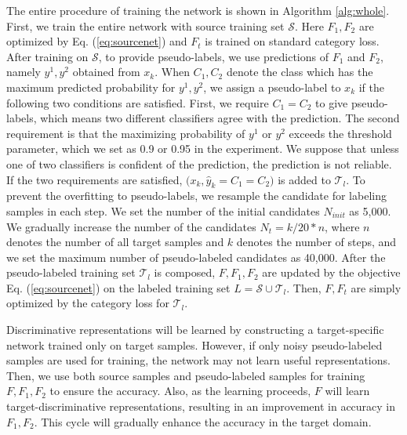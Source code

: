 \documentclass{article}
\begin{document}
The entire procedure of training the network is shown in Algorithm \ref{alg:whole}. First, we train the entire network with source training set $\mathcal{S}$. Here $F_1,F_2$ are optimized by Eq. (\ref{eq:sourcenet}) and $F_t$ is trained on standard category loss.
After training on $\mathcal{S}$, to provide pseudo-labels, we use predictions of $F_1$ and $F_2$, namely $y^{1},y^{2}$ obtained from $x_k$.
When $C_1,C_2$ denote the class which has the maximum predicted probability for $y^{1},y^{2}$, we assign a pseudo-label to $x_k$ if the following two conditions are satisfied. First, we require $C_1=C_2$ to give pseudo-labels, which means two different classifiers agree with the prediction. The second requirement is that the maximizing probability of $y^{1}$ or $y^{2}$ exceeds the threshold parameter, which we set as 0.9 or 0.95 in the experiment. We suppose that unless one of two classifiers is confident of the prediction, the prediction is not reliable. If the two requirements are satisfied, $\bigl({{x_k},{\hat{y}_k}=C_1=C_2}\bigr)$ is added to $\mathcal{T}_l$.
To prevent the overfitting to pseudo-labels, we resample the candidate for labeling samples in each step. We set the number of the initial candidates $N_{init}$ as 5,000. We gradually increase the number of the candidates $N_t = k / 20 *n$, where $n$ denotes the number of all target samples and $k$ denotes the number of steps, and we set the maximum number of pseudo-labeled candidates as 40,000. After the pseudo-labeled training set $\mathcal{T}_{l}$ is composed, $F,F_1,F_2$ are updated by the objective Eq. (\ref{eq:sourcenet}) on the labeled training set $L=\mathcal{S}\cup \mathcal{T}_l$. Then, $F,F_t$ are simply optimized by the category loss for $\mathcal{T}_{l}$.

Discriminative representations will be learned by constructing a target-specific network trained only on target samples. However, if only noisy pseudo-labeled samples are used for training, the network may not learn useful representations. Then, we use both source samples and pseudo-labeled samples for training $F,F_1,F_2$ to ensure the accuracy.
Also, as the learning proceeds, $F$ will learn target-discriminative representations, resulting in an improvement in accuracy in $F_1,F_2$. This cycle will gradually enhance the accuracy in the target domain.
\end{document}
